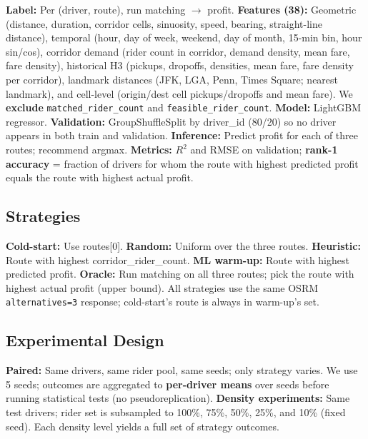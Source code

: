 \documentclass[11pt,a4paper]{article}
\begin{document}
\textbf{Label:} Per (driver, route), run matching $\to$ profit. \textbf{Features (38):} Geometric (distance, duration, corridor cells, sinuosity, speed, bearing, straight-line distance), temporal (hour, day of week, weekend, day of month, 15-min bin, hour sin/cos), corridor demand (rider count in corridor, demand density, mean fare, fare density), historical H3 (pickups, dropoffs, densities, mean fare, fare density per corridor), landmark distances (JFK, LGA, Penn, Times Square; nearest landmark), and cell-level (origin/dest cell pickups/dropoffs and mean fare). We \textbf{exclude} \texttt{matched\_rider\_count} and \texttt{feasible\_rider\_count}. \textbf{Model:} LightGBM regressor. \textbf{Validation:} GroupShuffleSplit by driver\_id (80/20) so no driver appears in both train and validation. \textbf{Inference:} Predict profit for each of three routes; recommend argmax. \textbf{Metrics:} $R^2$ and RMSE on validation; \textbf{rank-1 accuracy} = fraction of drivers for whom the route with highest predicted profit equals the route with highest actual profit.

\subsection{Strategies}

\textbf{Cold-start:} Use routes[0]. \textbf{Random:} Uniform over the three routes. \textbf{Heuristic:} Route with highest corridor\_rider\_count. \textbf{ML warm-up:} Route with highest predicted profit. \textbf{Oracle:} Run matching on all three routes; pick the route with highest actual profit (upper bound). All strategies use the same OSRM \texttt{alternatives=3} response; cold-start's route is always in warm-up's set.

\subsection{Experimental Design}

\textbf{Paired:} Same drivers, same rider pool, same seeds; only strategy varies. We use 5 seeds; outcomes are aggregated to \textbf{per-driver means} over seeds before running statistical tests (no pseudoreplication). \textbf{Density experiments:} Same test drivers; rider set is subsampled to 100\%, 75\%, 50\%, 25\%, and 10\% (fixed seed). Each density level yields a full set of strategy outcomes.

\end{document}
